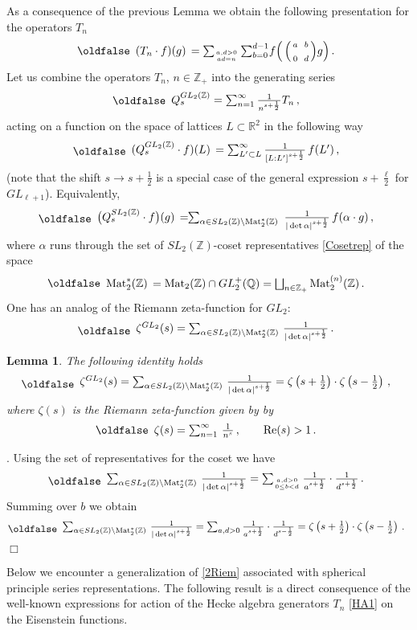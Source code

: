 \documentclass[12pt]{article}
\def\IQ{\mathbb{Q}}
\def\IR{\mathbb{R}}
\def\IZ{\mathbb{Z}}
\def\a {{\alpha}}
\def\Mat{{\rm Mat}}
\newtheorem{lem}{Lemma}[section]
\newcommand{\proof}{\noindent {\it Proof}. }
\def\be{\begin{eqnarray}\new\begin{array}{cc}}
\def\ee{\end{array}\end{eqnarray}}
\newcounter{pac}[section]
\begin{document}
As a consequence of the previous Lemma we obtain the following
presentation for the operators $T_n$
\be
  (T_n\cdot f)(g)\,
  =\sum_{a,d>0\atop ad=n}\sum_{b=0}^{d-1}\!
  f\Big(\,\Big(\begin{smallmatrix} a&&b\\&&\\0&&d\end{smallmatrix} \Big)g\Big)\,.
 \ee
Let us combine the operators $T_n$, $n\in \IZ_+$ into the  generating series
 \be
  Q^{GL_2(\IZ)}_s=\sum_{n=1}^\infty \frac{1}{n^{s+\frac{1}{2}}} T_n\,,
 \ee
acting on a function on the space of lattices $L\subset\IR^2$ in the
following way
 \be
  (Q^{GL_2(\IZ)}_s\cdot f)(L)\,
  =\sum_{L'\subset L}^\infty \frac{1}{[L:L']^{s+\frac{1}{2}}}\,f(L')\,,
  \ee
(note that  the shift $s\to s+\frac{1}{2}$ is a special case of the
general expression $s+\frac{\ell}{2}$ for $GL_{\ell+1}$).
Equivalently,
 \be\label{HBZ0}
  \bigl(Q^{SL_2(\IZ)}_s\cdot f\bigr)(g)\,
  =\!\!\sum_{\a\in SL_2(\IZ)\backslash\Mat^*_2(\IZ)}\,\,
  \frac{1}{|\det\a|^{s+\frac{1}{2}}} \,f(\alpha \cdot g)\,,
 \ee
where $\a$ runs through the set of $SL_2(\IZ)$-coset representatives
\eqref{Cosetrep} of the space
 \be
  \Mat^*_2(\IZ)\,={\rm
    Mat}_2(\IZ)\cap GL_2^+(\IQ)=\bigsqcup_{n\in \IZ_+} \Mat^{(n)}_2(\IZ)\,.
 \ee
One has an  analog of the Riemann zeta-function for $GL_2$:
 \be
\zeta^{GL_2}(s)=\sum_{\alpha\in  SL_2(\IZ)\backslash {\rm Mat}^*_2(\IZ)}\,
\frac{1}{|\det  \alpha|^{s+\frac{1}{2}}}\,.
\ee
\begin{lem} The following identity holds
\be\label{2Riem}
\zeta^{GL_2}(s)=\sum_{\alpha\in SL_2(\IZ)\backslash {\rm Mat}^*_2(\IZ)}\,
\frac{1}{|\det  \alpha|^{s+\frac{1}{2}}}=\zeta\left(s+\frac{1}{2}\right)\cdot
\zeta\left(s-\frac{1}{2}\right)\,,
\ee
where $\zeta(s)$ is the Riemann zeta-function given by
by
\be
\zeta(s)=\sum_{n=1}^{\infty} \,\frac{1}{n^s}\,, \qquad {\rm Re}(s)>1\,.
\ee
\end{lem}

\proof Using the set of representatives for the coset we have
\be
\sum_{\alpha \in SL_2(\IZ)\backslash {\rm Mat}^*_2(\IZ)}\,
\frac{1}{|\det  \alpha |^{s+\frac{1}{2}}}=\sum_{a,d>0 \atop 0\leq b<d}
\frac{1}{a^{s+\frac{1}{2}}}\cdot
\frac{1}{d^{s+\frac{1}{2}}}\,.
\ee
Summing over $b$ we obtain
\be
\sum_{\alpha \in SL_2(\IZ)\backslash {\rm Mat}^*_2(\IZ)}\,
\frac{1}{|\det  \alpha|^{s+\frac{1}{2}}}=\sum_{a,d>0}\frac{1}{a^{s+\frac{1}{2}}}\cdot
\frac{1}{d^{s-\frac{1}{2}}}=
\zeta\left(s+\frac{1}{2}\right)\cdot \zeta\left(s-\frac{1}{2}\right)\,.
\ee
$\Box$

Below we encounter a generalization of \eqref{2Riem}
associated with   spherical principle series representations.  The
following result is a direct consequence of the well-known expressions
for action of the Hecke algebra generators $T_n$ \eqref{HA1} on the
Eisenstein functions.
\end{document}
